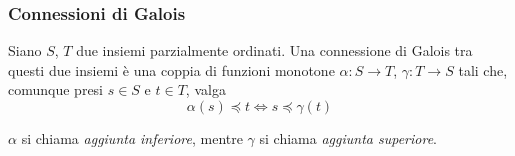 \documentclass[12pt]{article}
\numberwithin{theorem}{subsection}
\begin{document}
%	

%	
%	

\subsubsection{Connessioni di Galois}
\begin{definition}
	Siano $S$, $T$ due insiemi parzialmente ordinati. Una connessione di Galois tra questi due insiemi è una coppia di funzioni monotone $\alpha : S \rightarrow T$, $\gamma : T \rightarrow S$ tali che, comunque presi $s \in S$ e $t \in T$, valga
	\[
		\alpha(s) \preceq t \iff s \preceq \gamma(t)
	\]
	
	$\alpha$ si chiama \textit{aggiunta inferiore}, mentre $\gamma$ si chiama \textit{aggiunta superiore}.
\end{definition}
\end{document}
